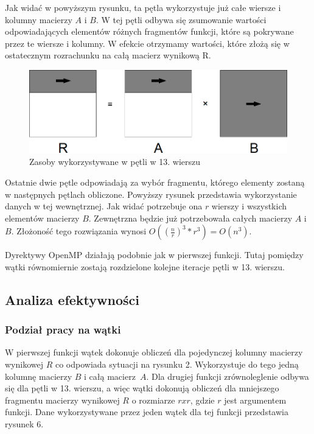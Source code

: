 \documentclass{article}
\begin{document}
Jak widać w powyższym rysunku, ta pętla wykorzystuje już całe wiersze i kolumny macierzy $A$ i $B$. W tej pętli odbywa się zsumowanie wartości odpowiadających elementów różnych fragmentów funkcji, które są pokrywane przez te wiersze i kolumny. W efekcie otrzymamy wartości, które złożą się w ostatecznym rozrachunku na całą macierz wynikową R.

\begin{figure}[H]
	\centering
	\includegraphics[width=\linewidth]{./images/6/lokOut1.png}
	\caption{Zasoby wykorzystywane w pętli w 13. wierszu}
	\label{fig:6outer1}
\end{figure}

Ostatnie dwie pętle odpowiadają za wybór fragmentu, którego elementy zostaną w następnych pętlach obliczone. Powyższy rysunek przedstawia wykorzystanie danych w tej wewnętrznej. Jak widać potrzebuje ona $r$ wierszy i wszystkich elementów macierzy $B$. Zewnętrzna będzie już potrzebowała całych macierzy $A$ i $B$. Złożoność tego rozwiązania wynosi $O((\frac{n}{r})^3*r^3)=O(n^3)$.

Dyrektywy OpenMP działają podobnie jak w pierwszej funkcji. Tutaj pomiędzy wątki równomiernie zostają rozdzielone kolejne iteracje pętli w 13. wierszu.

\subsection{Analiza efektywności}
\subsubsection{Podział pracy na wątki}

W pierwszej funkcji wątek dokonuje obliczeń dla pojedynczej kolumny macierzy wynikowej $R$ co odpowiada sytuacji na rysunku 2. Wykorzystuje do tego jedną kolumnę macierzy $B$ i całą macierz~$A$. Dla drugiej funkcji zrównoleglenie odbywa się dla pętli w 13. wierszu, a więc wątki dokonują obliczeń dla mniejszego fragmentu macierzy wynikowej $R$ o rozmiarze $r x r$, gdzie $r$ jest argumentem funkcji. Dane wykorzystywane przez jeden wątek dla tej funkcji przedstawia rysunek 6.
\end{document}
